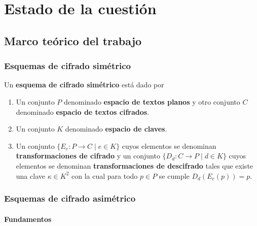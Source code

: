 \chapter{Estado de la cuestión}  

\section{Marco teórico del trabajo}

\subsection{Esquemas de cifrado simétrico}

\begin{definition}
	Un \textbf{esquema de cifrado simétrico} está dado por
	\begin{enumerate}
		\item Un conjunto $P$ denominado \textbf{espacio de textos planos} y otro conjunto $C$ denominado \textbf{espacio de textos cifrados}.
		\item Un conjunto $K$ denominado \textbf{espacio de claves}.
		\item Un conjunto $\{E_e : P \rightarrow C \mid e \in K\}$ cuyos elementos se denominan \textbf{transformaciones de cifrado} y un conjunto $\{D_d : C \rightarrow P \mid d \in K\}$ cuyos elementos se denominan \textbf{transformaciones de descifrado} tales que existe una clave $\kappa \in K^2$ con la cual para todo $p \in P$ se cumple $D_d(E_e(p)) = p$. 
	\end{enumerate}
\end{definition}
\subsection{Esquemas de cifrado asimétrico}

\subsubsection{Fundamentos}

